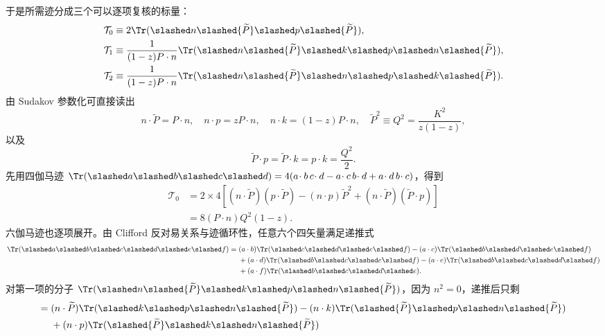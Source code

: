 \begin{derivation}
于是所需迹分成三个可以逐项复核的标量：
\begin{align*}
\mathcal T_0
&\equiv2\Tr(\slashed n\slashed{\widetilde P}\slashed p\slashed{\widetilde P}),\\
\mathcal T_1
&\equiv\frac{1}{(1-z)P\cdot n}
\Tr(\slashed n\slashed{\widetilde P}\slashed k\slashed p
\slashed n\slashed{\widetilde P}),\\
\mathcal T_2
&\equiv\frac{1}{(1-z)P\cdot n}
\Tr(\slashed n\slashed{\widetilde P}\slashed n\slashed p
\slashed k\slashed{\widetilde P}).
\end{align*}
由 Sudakov 参数化可直接读出
\begin{equation*}
 n\cdot\widetilde P=P\cdot n,
 \quad n\cdot p=zP\cdot n,
 \quad n\cdot k=(1-z)P\cdot n,
 \quad \widetilde P^2\equiv Q^2=\frac{K^2}{z(1-z)},
\end{equation*}
以及
\begin{equation*}
 \widetilde P\cdot p
 =\widetilde P\cdot k
 =p\cdot k=\frac{Q^2}{2}.
\end{equation*}
先用四伽马迹
$\Tr(\slashed a\slashed b\slashed c\slashed d)
=4(a\!\cdot b\,c\!\cdot d-a\!\cdot c\,b\!\cdot d+a\!\cdot d\,b\!\cdot c)$，得到
\begin{align*}
\mathcal T_0
&=2\times4\left[
 (n\cdot\widetilde P)(p\cdot\widetilde P)
 -(n\cdot p)\widetilde P^2
 +(n\cdot\widetilde P)(\widetilde P\cdot p)
 \right]\\
&=8(P\cdot n)Q^2(1-z).
\end{align*}
六伽马迹也逐项展开。由 Clifford 反对易关系与迹循环性，任意六个四矢量满足递推式
\begin{align*}
\Tr(\slashed a\slashed b\slashed c\slashed d\slashed e\slashed f)
={}&(a\cdot b)\Tr(\slashed c\slashed d\slashed e\slashed f)
-(a\cdot c)\Tr(\slashed b\slashed d\slashed e\slashed f)\\
&+(a\cdot d)\Tr(\slashed b\slashed c\slashed e\slashed f)
-(a\cdot e)\Tr(\slashed b\slashed c\slashed d\slashed f)\\
&+(a\cdot f)\Tr(\slashed b\slashed c\slashed d\slashed e).
\end{align*}
对第一项的分子
\(\Tr(\slashed n\slashed{\widetilde P}\slashed k\slashed p
\slashed n\slashed{\widetilde P})\)，因为 $n^2=0$，递推后只剩
\begin{align*}
={}&(n\cdot\widetilde P)\Tr(\slashed k\slashed p\slashed n\slashed{\widetilde P})
-(n\cdot k)\Tr(\slashed{\widetilde P}\slashed p\slashed n\slashed{\widetilde P})\\
&+(n\cdot p)\Tr(\slashed{\widetilde P}\slashed k\slashed n\slashed{\widetilde P})

\end{align*}
\end{derivation}
